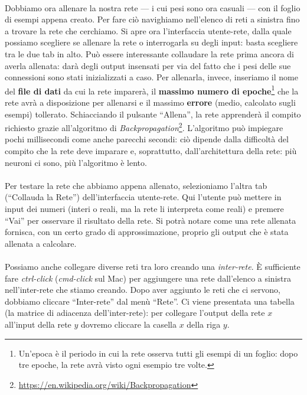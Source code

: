 \documentclass{article}
\begin{document}
\paragraph{} Dobbiamo ora allenare la nostra rete --- i cui pesi sono ora casuali --- con il foglio di esempi appena creato. Per fare ciò navighiamo nell'elenco di reti a sinistra fino a trovare la rete che cerchiamo. Si apre ora l'interfaccia utente-rete, dalla quale possiamo scegliere se allenare la rete o interrogarla su degli input: basta scegliere tra le due tab in alto. Può essere interessante collaudare la rete prima ancora di averla allenata: darà degli output insensati per via del fatto che i pesi delle sue connessioni sono stati inizializzati a caso. Per allenarla, invece, inseriamo il nome del \textbf{file di dati} da cui la rete imparerà, il \textbf{massimo numero di epoche}\footnote{Un'epoca è il periodo in cui la rete osserva tutti gli esempi di un foglio: dopo tre epoche, la rete avrà visto ogni esempio tre volte.} che la rete avrà a disposizione per allenarsi e il massimo \textbf{errore} (medio, calcolato sugli esempi) tollerato. Schiacciando il pulsante “Allena”, la rete apprenderà il compito richiesto grazie all'algoritmo di \emph{Backpropagation}\footnote{\url{https://en.wikipedia.org/wiki/Backpropagation}}. L'algoritmo può impiegare pochi millisecondi come anche parecchi secondi: ciò dipende dalla difficoltà del compito che la rete deve imparare e, soprattutto, dall'architettura della rete: più neuroni ci sono, più l'algoritmo è lento.

\paragraph{} Per testare la rete che abbiamo appena allenato, selezioniamo l'altra tab (“Collauda la Rete”) dell'interfaccia utente-rete. Qui l'utente può mettere in input dei numeri (interi o reali, ma la rete li interpreta come reali) e premere “Vai” per osservare il risultato della rete. Si potrà notare come una rete allenata fornisca, con un certo grado di approssimazione, proprio gli output che è stata allenata a calcolare.

\paragraph{} Possiamo anche collegare diverse reti tra loro creando una \emph{inter-rete}. È sufficiente fare \emph{ctrl-click} (\emph{cmd-click} sul Mac) per aggiungere una rete dall'elenco a sinistra nell'inter-rete che stiamo creando. Dopo aver aggiunto le reti che ci servono, dobbiamo cliccare “Inter-rete” dal menù “Rete”. Ci viene presentata una tabella (la matrice di adiacenza dell'inter-rete): per collegare l'output della rete $x$ all'input della rete $y$ dovremo cliccare la casella $x$ della riga $y$.
\end{document}
